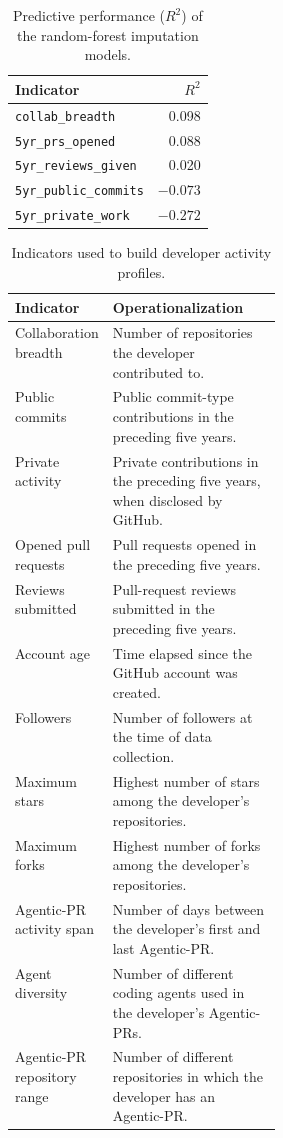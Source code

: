 \begin{table}[H]
    \centering
    \caption{Predictive performance ($R^2$) of the random-forest imputation models.}
    \label{tab:r2-values}
    \small
    \begin{tabular}{lr}
        \toprule
        \textbf{Indicator} & \textbf{$R^2$} \\
        \midrule
        \texttt{collab\_breadth} & 0.098 \\
        \texttt{5yr\_prs\_opened} & 0.088 \\
        \texttt{5yr\_reviews\_given} & 0.020 \\
        \texttt{5yr\_public\_commits} & $-0.073$ \\
        \texttt{5yr\_private\_work} & $-0.272$ \\
        \bottomrule
    \end{tabular}
\end{table}
\begin{table}[H]
    \centering
    \caption{Indicators used to build developer activity profiles.}
    \label{tab:profile-indicators}
    \small
    \begin{tabularx}{\linewidth}{@{}p{0.31\linewidth}X@{}}
        \toprule
        \textbf{Indicator} & \textbf{Operationalization} \\
        \midrule
        Collaboration breadth & Number of repositories the developer contributed to. \\
        Public commits & Public commit-type contributions in the preceding five years. \\
        Private activity & Private contributions in the preceding five years, when disclosed by GitHub. \\
        Opened pull requests & Pull requests opened in the preceding five years. \\
        Reviews submitted & Pull-request reviews submitted in the preceding five years. \\
        Account age & Time elapsed since the GitHub account was created. \\
        Followers & Number of followers at the time of data collection. \\
        Maximum stars & Highest number of stars among the developer's repositories. \\
        Maximum forks & Highest number of forks among the developer's repositories. \\
        Agentic-PR activity span & Number of days between the developer's first and last Agentic-PR. \\
        Agent diversity & Number of different coding agents used in the developer's Agentic-PRs. \\
        Agentic-PR repository range & Number of different repositories in which the developer has an Agentic-PR. \\
        \bottomrule
    \end{tabularx}
\end{table}

